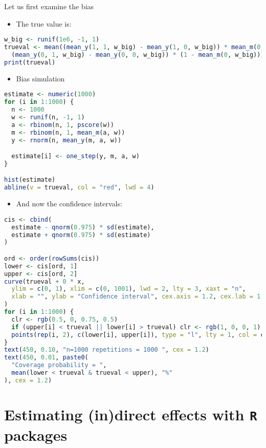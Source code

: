\documentclass[
  12pt,
]{book}
\providecommand{\tightlist}{%
  \setlength{\itemsep}{0pt}\setlength{\parskip}{0pt}}
\theoremstyle{definition}
\theoremstyle{definition}
\theoremstyle{definition}
\newcommand{\1}{\mathbbm{1}}
\begin{document}
Let us first examine the bias

\begin{itemize}
\tightlist
\item
  The true value is:
\end{itemize}

\begin{lstlisting}[language=R]
w_big <- runif(1e6, -1, 1)
trueval <- mean((mean_y(1, 1, w_big) - mean_y(1, 0, w_big)) * mean_m(0, w_big) +
  (mean_y(0, 1, w_big) - mean_y(0, 0, w_big)) * (1 - mean_m(0, w_big)))
print(trueval)
\end{lstlisting}

\begin{itemize}
\tightlist
\item
  Bias simulation
\end{itemize}

\begin{lstlisting}[language=R]
estimate <- numeric(1000)
for (i in 1:1000) {
  n <- 1000
  w <- runif(n, -1, 1)
  a <- rbinom(n, 1, pscore(w))
  m <- rbinom(n, 1, mean_m(a, w))
  y <- rnorm(n, mean_y(m, a, w))

  estimate[i] <- one_step(y, m, a, w)
}

hist(estimate)
abline(v = trueval, col = "red", lwd = 4)
\end{lstlisting}

\begin{itemize}
\tightlist
\item
  And now the confidence intervals:
\end{itemize}

\begin{lstlisting}[language=R]
cis <- cbind(
  estimate - qnorm(0.975) * sd(estimate),
  estimate + qnorm(0.975) * sd(estimate)
)

ord <- order(rowSums(cis))
lower <- cis[ord, 1]
upper <- cis[ord, 2]
curve(trueval + 0 * x,
  ylim = c(0, 1), xlim = c(0, 1001), lwd = 2, lty = 3, xaxt = "n",
  xlab = "", ylab = "Confidence interval", cex.axis = 1.2, cex.lab = 1.2
)
for (i in 1:1000) {
  clr <- rgb(0.5, 0, 0.75, 0.5)
  if (upper[i] < trueval || lower[i] > trueval) clr <- rgb(1, 0, 0, 1)
  points(rep(i, 2), c(lower[i], upper[i]), type = "l", lty = 1, col = clr)
}
text(450, 0.10, "n=1000 repetitions = 1000 ", cex = 1.2)
text(450, 0.01, paste0(
  "Coverage probability = ",
  mean(lower < trueval & trueval < upper), "%"
), cex = 1.2)
\end{lstlisting}

\hypertarget{estimating-indirect-effects-with-r-packages}{%
\chapter{\texorpdfstring{Estimating (in)direct effects with \texttt{R} packages}{Estimating (in)direct effects with R packages}}\label{estimating-indirect-effects-with-r-packages}}
\end{document}

